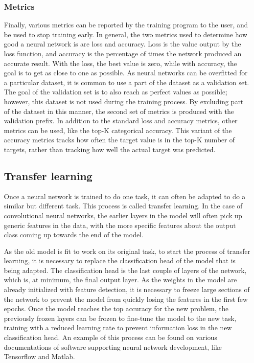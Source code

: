 \subsubsection{Metrics}
Finally, various metrics can be reported by the training program to the user, and be used to stop training early.
In general, the two metrics used to determine how good a neural network is are loss and accuracy.
Loss is the value output by the loss function, and accuracy is the percentage of times the network produced an accurate result.
With the loss, the best value is zero, while with accuracy, the goal is to get as close to one as possible.
As neural networks can be overfitted for a particular dataset, it is common to use a part of the dataset as a validation set.
The goal of the validation set is to also reach as perfect values as possible; however, this dataset is not used during the training process.
By excluding part of the dataset in this manner, the second set of metrics is produced with the validation prefix.
In addition to the standard loss and accuracy metrics, other metrics can be used, like the top-K categorical accuracy.
This variant of the accuracy metrics tracks how often the target value is in the top-K number of targets, rather than tracking how well the actual target was predicted.

\subsection{Transfer learning}
Once a neural network is trained to do one task, it can often be adapted to do a similar but different task.
This process is called transfer learning\cite{wiki:transferlearning}.
In the case of convolutional neural networks, the earlier layers in the model will often pick up generic features in the data, with the more specific features about the output class coming up towards the end of the model.

As the old model is fit to work on its original task, to start the process of transfer learning, it is necessary to replace the classification head of the model that is being adapted.
The classification head is the last couple of layers of the network, which is, at minimum, the final output layer.
As the weights in the model are already initialized with feature detection, it is necessary to freeze large sections of the network to prevent the model from quickly losing the features in the first few epochs.
Once the model reaches the top accuracy for the new problem, the previously frozen layers can be frozen to fine-tune the model to the new task, training with a reduced learning rate to prevent information loss in the new classification head.
An example of this process can be found on various documentations of software supporting neural network development, like Tensorflow\cite{tensorflow:transferlearning} and Matlab\cite{MatlabPretrained}.


